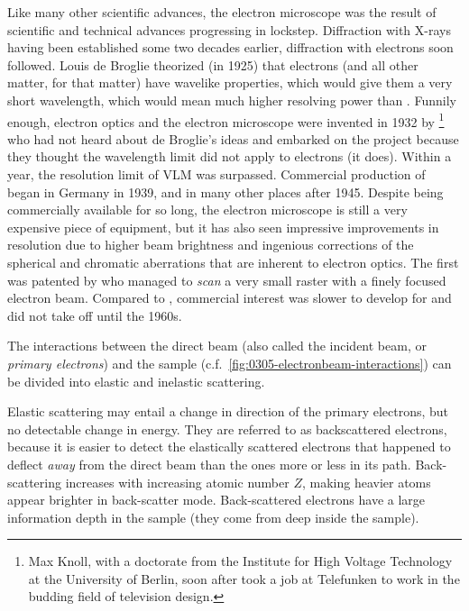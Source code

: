 \documentclass[webedition,openright,titles,swedish,english]{LuaUUThesis}\usepackage[]{graphicx}\usepackage[]{xcolor}
\newcommand{\cf}{c.f.}
\begin{document}
Like many other scientific advances, the electron microscope was the result
of scientific and technical advances progressing in lockstep.
Diffraction with X-rays having been established some two decades earlier,
diffraction with electrons soon followed.
Louis de Broglie theorized (in 1925) that electrons (and all other matter,
for that matter) have wavelike properties, which would give them a very short
wavelength, which would mean much higher resolving power than .
Funnily enough, electron optics and the electron microscope were invented
in 1932 by \textcite{Knoll1932,Knoll1932a,Knoll1932b}%
\footnote{%
   Max Knoll, with a doctorate from the Institute for High Voltage Technology
   at the University of Berlin, soon after took a job at Telefunken to work in
   the budding field of television design.}
who had not heard about de Broglie's
ideas \cite{Williams1996} and embarked on the project because they thought the
wavelength limit did not apply to electrons (it does).
Within a year, the resolution limit of \gls{VLM} was surpassed.
Commercial production of  began in Germany in 1939,
and in many other places after 1945.
Despite being commercially available for so long, the electron microscope is still a very expensive
piece of equipment, but it has also seen impressive improvements in resolution
due to higher beam brightness and ingenious corrections of
the spherical and chromatic aberrations that are inherent to electron optics.
The first  was patented by \textcite{vonArdenne1939} who managed
to \emph{scan} a very small raster with a finely focused electron beam.
Compared to , commercial interest was slower to develop for
 and did not take off until the 1960s.

The interactions between the direct beam
(also called the incident beam, or \emph{primary electrons})
and the sample (\cf\ \cref{fig:0305-electronbeam-interactions})
can be divided into elastic and inelastic scattering.

Elastic scattering may entail a change in direction of the primary electrons,
but no detectable change in energy. They are referred to as backscattered electrons,
because it is easier to detect the elastically scattered electrons that happened
to deflect \emph{away} from the direct beam than the ones more or less in its path.
Back-scattering increases with increasing atomic number $Z$, making heavier atoms
appear brighter in back-scatter mode. Back-scattered electrons have a large information
depth in the sample  (they come from deep inside the sample).
\end{document}
